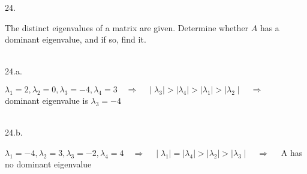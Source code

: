 \documentclass[12pt]{book}
\begin{document}
\begin{CJK}{UTF8}{bsmi}
24. \begin{minipage}[t]{\dimexpr\linewidth-2em}
The distinct eigenvalues of a matrix are given. Determine whether $A$ has a dominant eigenvalue, and if so, find it. \\
\end{minipage}\\

24.a. \begin{minipage}[t]{\dimexpr\linewidth-2em}
$\lambda_1=2, \lambda_2=0, \lambda_3=-4, \lambda_4=3\quad\Rightarrow\quad\mid\lambda_3\mid>\mid\lambda_4\mid>\mid\lambda_1\mid>\mid\lambda_2\mid\quad\Rightarrow\quad$ dominant eigenvalue is  $\lambda_3=-4$
\end{minipage}\\

24.b. \begin{minipage}[t]{\dimexpr\linewidth-2em}
$\lambda_1=-4, \lambda_2=3, \lambda_3=-2, \lambda_4=4\quad\Rightarrow\quad\mid\lambda_1\mid=\mid\lambda_4\mid>\mid\lambda_2\mid>\mid\lambda_3\mid\quad\Rightarrow\quad$ A has no dominant eigenvalue
\end{minipage}\\


\end{CJK}
\end{document}
